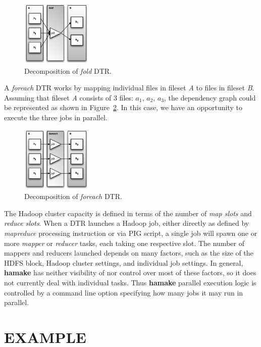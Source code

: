 \documentclass[a4paper,twoside]{article}
\begin{document}
\begin{figure}[htp]
\centering
\includegraphics[width=0.3\textwidth]{twofoldp.eps}
\caption{Decomposition of \emph{fold} DTR.}
\label{fig:fold2}
\end{figure}

A \emph{foreach} DTR works by mapping individual files in fileset
\textit{A} to files in fileset \textit{B}. Assuming that fileset
\textit{A} consists of 3 files: \textit{$a_1$}, \textit{$a_2$},
\textit{$a_3$}, the dependency graph could be represented as shown
in Figure~\ref{fig:foreach2}. In this case, we have an opportunity to execute the three jobs in parallel.

\begin{figure}[htp]
\centering
\includegraphics[width=0.3\textwidth]{twoforeachp.eps}
\caption{Decomposition of \emph{foreach} DTR.}
\label{fig:foreach2}
\end{figure}

The Hadoop cluster capacity is defined in terms of the number of
\textit{map slots} and \textit{reduce slots}. When a DTR launches a
Hadoop job, either directly as defined by \emph{mapreduce} processing instruction or via PIG script, a single job will spawn one or more \emph{mapper} or \emph{reducer} tasks, each taking one respective slot. The number of mappers and reducers launched depends on many factors, such as the size of the HDFS block, Hadoop cluster settings, and individual job settings. In general, \textbf{hamake} has neither visibility of nor control over most of these factors, so it does not currently  deal with individual tasks. Thus \textbf{hamake} parallel
execution logic is controlled by a command line option specifying how many jobs it may run in parallel.

\section{\uppercase{Example}}
\end{document}
